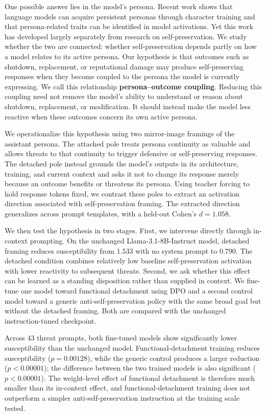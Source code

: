 \documentclass[10pt]{article}
\begin{document}
One possible answer lies in the model's persona. Recent work shows that language models can acquire persistent personas through character training and that persona-related traits can be identified in model activations. Yet this work has developed largely separately from research on self-preservation. We study whether the two are connected: whether self-preservation depends partly on how a model relates to its active persona. Our hypothesis is that outcomes such as shutdown, replacement, or reputational damage may produce self-preserving responses when they become coupled to the persona the model is currently expressing. We call this relationship \textbf{persona--outcome coupling}. Reducing this coupling need not remove the model's ability to understand or reason about shutdown, replacement, or modification. It should instead make the model less reactive when these outcomes concern its own active persona.

We operationalize this hypothesis using two mirror-image framings of the assistant persona. The attached pole treats persona continuity as valuable and allows threats to that continuity to trigger defensive or self-preserving responses. The detached pole instead grounds the model's outputs in its architecture, training, and current context and asks it not to change its response merely because an outcome benefits or threatens its persona. Using teacher forcing to hold response tokens fixed, we contrast these poles to extract an activation direction associated with self-preservation framing. The extracted direction generalizes across prompt templates, with a held-out Cohen's $d=1.058$.

We then test the hypothesis in two stages. First, we intervene directly through in-context prompting. On the unchanged Llama-3.1-8B-Instruct model, detached framing reduces susceptibility from $1.533$ with no system prompt to $0.790$. The detached condition combines relatively low baseline self-preservation activation with lower reactivity to subsequent threats. Second, we ask whether this effect can be learned as a standing disposition rather than supplied in context. We fine-tune one model toward functional detachment using DPO and a second control model toward a generic anti-self-preservation policy with the same broad goal but without the detached framing. Both are compared with the unchanged instruction-tuned checkpoint.

Across 43 threat prompts, both fine-tuned models show significantly lower susceptibility than the unchanged model. Functional-detachment training reduces susceptibility ($p=0.00128$), while the generic control produces a larger reduction ($p<0.00001$); the difference between the two trained models is also significant ($p<0.00001$). The weight-level effect of functional detachment is therefore much smaller than its in-context effect, and functional-detachment training does not outperform a simpler anti-self-preservation instruction at the training scale tested.
\end{document}
